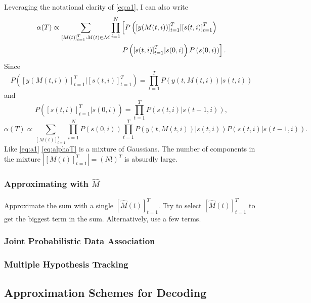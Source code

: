 \documentclass[12pt]{article}
\newcommand{\M}{{\cal M}}
\newcommand{\os}[4]{{\left[ #1(#2) \right]}_{#3}^{#4}} %
\newcommand{\ti}[2]{{#1}{(#2)}}                         %
\newcommand{\ts}[4]{\os{#1}{#2}{#2=#3}{#4}} %
\begin{document}
Leveraging the notational clarity of \eqref{eq:a1}, I can also write
\begin{align*}
  \ti{\alpha}{T} \propto \sum_{\os{M}{t}{t=1}{T}:\ti{M}{t}\in \M}
  \prod_{i=1}^N& \left[
  P\left( \os{y}{\ti{M}{t,i}}{t=1}{T} | \os{s}{t,i}{t=1}{T}\right) \right. \\
  & \left. P\left( \os{s}{t,i}{t=1}{T}| \ti{s}{0,i} \right)
  P\left( \ti{s}{0,i} \right) \right] .
\end{align*}
Since
\begin{equation*}
  P\left( \os{y}{\ti{M}{t,i}}{t=1}{T} | \os{s}{t,i}{t=1}{T}\right) =
  \prod_{t=1}^T P\left( \ti{y}{t,\ti{M}{t,i}} | \ti{s}{t,i}\right)
\end{equation*}
and
\begin{equation*}
  P\left( \os{s}{t,i}{t=1}{T}| \ti{s}{0,i} \right) = \prod_{t=1}^T
  P\left( \ti{s}{t,i} | \ti{s}{t-1,i}\right),
\end{equation*}
\begin{equation}
  \label{eq:alphaT}
  \ti{\alpha}{T} \propto \sum_{\os{M}{t}{t=1}{T}}
  \prod_{i=1}^N  P\left( \ti{s}{0,i} \right) \prod_{t=1}^T
  P\left( \ti{y}{t,\ti{M}{t,i}} | \ti{s}{t,i}\right)
  P\left( \ti{s}{t,i} | \ti{s}{t-1,i}\right).
\end{equation}
Like \eqref{eq:a1} \eqref{eq:alphaT} is a mixture of Gaussians.  The
number of components in the mixture $\left| \ts{M}{t}{1}{T}\right| =
(N!)^T$ is absurdly large.

\subsubsection{Approximating with $\hat M$}
\label{sec:Mhat.filter}

Approximate the sum with a single $\ts{\hat M}{t}{1}{T}$.  Try to select
$\ts{\hat M}{t}{1}{T}$ to get the biggest term in the sum.
Alternatively, use a few terms.

\subsubsection{Joint Probabilistic Data Association}
\label{sec:JPDA.filter}

\subsubsection{Multiple Hypothesis Tracking}
\label{sec:MHT.filter}

\subsection{Approximation Schemes for Decoding}
\label{sec:approximation.decode}
\end{document}
